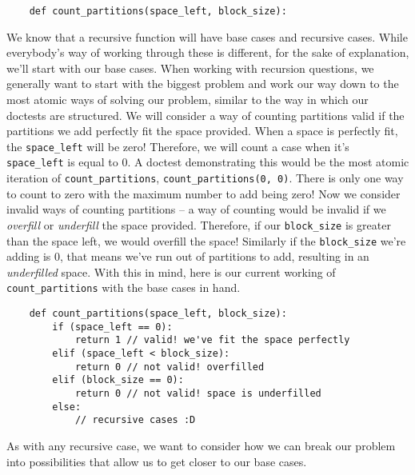 \clearpage
\begin{blocksection}
\begin{lstlisting}
    def count_partitions(space_left, block_size):
\end{lstlisting}
We know that a recursive function will have base cases and recursive cases. While everybody's way of working through these is different, for the sake of explanation, we'll start with our base cases. When working with recursion questions, we generally want to start with the biggest problem and work our way down to the most atomic ways of solving our problem, similar to the way in which our doctests are structured.
\newline
\newline
We will consider a way of counting partitions valid if the partitions we add perfectly fit the space provided. When a space is perfectly fit, the \lstinline{space_left} will be zero! Therefore, we will count a case when it's \lstinline{space_left} is equal to 0.
\newline
\newline
A doctest demonstrating this would be the most atomic iteration of \lstinline{count_partitions}, \lstinline{count_partitions(0, 0)}. There is only one way to count to zero with the maximum number to add being zero! 
\newline
\newline
Now we consider invalid ways of counting partitions -- a way of counting would be invalid if we \textit{overfill} or \textit{underfill} the space provided. Therefore, if our \lstinline{block_size} is greater than the space left, we would overfill the space! Similarly if the \lstinline{block_size} we're adding is 0, that means we've run out of partitions to add, resulting in an \textit{underfilled} space.
\newline
\newline
With this in mind, here is our current working of \lstinline{count_partitions} with the base cases in hand.
\begin{lstlisting}
    def count_partitions(space_left, block_size):
        if (space_left == 0): 
            return 1 // valid! we've fit the space perfectly
        elif (space_left < block_size): 
            return 0 // not valid! overfilled
        elif (block_size == 0):
            return 0 // not valid! space is underfilled
        else:
            // recursive cases :D
\end{lstlisting}
As with any recursive case, we want to consider how we can break our problem into possibilities that allow us to get closer to our base cases.
\end{blocksection}
